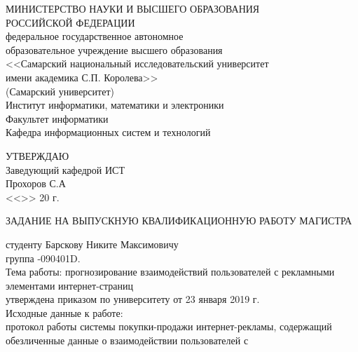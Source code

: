 \thispagestyle{empty}
\begin{center}
МИНИСТЕРСТВО НАУКИ И ВЫСШЕГО ОБРАЗОВАНИЯ \\
РОССИЙСКОЙ ФЕДЕРАЦИИ\vspace{14pt} \\
федеральное государственное автономное \\
образовательное учреждение высшего образования \\
<<Самарский национальный исследовательский университет \\
имени академика С.П. Королева>> \\
(Самарский университет)\vspace{14pt} \\
Институт информатики, математики и электроники \\
Факультет информатики \\
Кафедра информационных систем и технологий\vspace{28pt} \\
\end{center}
\begin{flushright}
    \onehalfspacing{}
    \begin{center}
        УТВЕРЖДАЮ\\
        Заведующий кафедрой ИСТ\\
        \underline{\hspace{4cm}} Прохоров С.А\\
        <<\underline{\hspace{0.75cm}}>> \underline{\hspace{4.13cm}} 20\underline{\hspace{0.75cm}} г.
    \end{center}
\end{flushright}\vspace{28pt}
\begin{center}
    ЗАДАНИЕ НА ВЫПУСКНУЮ КВАЛИФИКАЦИОННУЮ РАБОТУ МАГИСТРА
\end{center}\vspace{14pt}
\onehalfspacing{}
студенту Барскову Никите Максимовичу \\
группа -090401D. \\
Тема работы: прогнозирование взаимодействий пользователей с рекламными элементами интернет-страниц \\
утверждена приказом по университету  от 23 января 2019 г. \\
Исходные данные к работе: \\
протокол работы системы покупки-продажи интернет-рекламы, содержащий обезличенные данные о взаимодействии пользователей с
